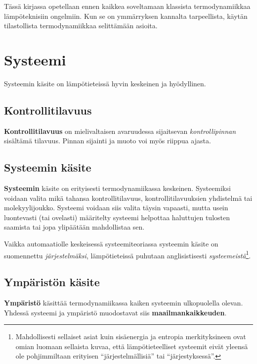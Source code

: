 \documentclass[12pt,a4paper,finnish]{book}
\begin{document}
Tässä kirjassa opetellaan ennen kaikkea soveltamaan klassista termodynamiikkaa lämpöteknisiin ongelmiin. 
Kun se on ymmärryksen kannalta tarpeellista, käytän tilastollista termodynamiikkaa selittämään asioita.

\chapter{Systeemi} %

Systeemin käsite on lämpötieteissä hyvin keskeinen ja hyödyllinen.

\section{Kontrollitilavuus}  %

\textbf{Kontrollitilavuus} on mielivaltaisen avaruudessa sijaitsevan \textit{kontrollipinnan} sisältämä tilavuus. 
Pinnan sijainti ja muoto voi myös riippua ajasta. 
\section{Systeemin käsite} %

\textbf{Systeemin} käsite on erityisesti termodynamiikassa keskeinen. Systeemiksi voidaan valita mikä tahansa 
kontrollitilavuus, kontrollitilavuuksien yhdistelmä tai molekyylijoukko. Systeemi
voidaan siis valita täysin vapaasti, mutta usein luontevasti (tai ovelasti) määritelty systeemi helpottaa 
haluttujen tulosten saamista tai jopa ylipäätään mahdollistaa sen.

Vaikka automaatiolle keskeisessä systeemiteoriassa systeemin käsite on suomennettu \textit{järjestelmäksi},
lämpötieteissä puhutaan anglisistisesti \textit{systeemeistä}\footnote{Mahdollisesti sellaiset asiat kuin 
sisäenergia ja entropia merkityksineen ovat omian luomaan sellaista kuvaa, että lämpötieteelliset systeemit eivät 
yleensä ole pohjimmiltaan erityisen ``järjestelmällisiä'' tai ``järjestyksessä''.}.

\section{Ympäristön käsite} %

\textbf{Ympäristö} käsittää termodynamiikassa kaiken systeemin ulkopuolella olevan. Yhdessä systeemi ja ympäristö 
muodostavat siis \textbf{maailmankaikkeuden}.
\end{document}
